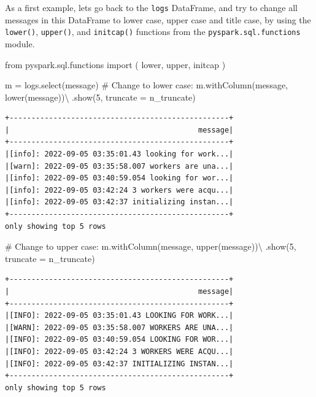 \documentclass[
  11pt,
  letterpaper,
  DIV=11,
  numbers=noendperiod]{scrreprt}
\newenvironment{Shaded}{\begin{snugshade}}{\end{snugshade}}
\newcommand{\CommentTok}[1]{\textcolor[rgb]{0.37,0.37,0.37}{#1}}
\newcommand{\DecValTok}[1]{\textcolor[rgb]{0.68,0.00,0.00}{#1}}
\newcommand{\ImportTok}[1]{\textcolor[rgb]{0.00,0.46,0.62}{#1}}
\newcommand{\NormalTok}[1]{\textcolor[rgb]{0.00,0.23,0.31}{#1}}
\newcommand{\OperatorTok}[1]{\textcolor[rgb]{0.37,0.37,0.37}{#1}}
\newcommand{\StringTok}[1]{\textcolor[rgb]{0.13,0.47,0.30}{#1}}
\begin{document}
As a first example, lets go back to the \texttt{logs} DataFrame, and try
to change all messages in this DataFrame to lower case, upper case and
title case, by using the \texttt{lower()}, \texttt{upper()}, and
\texttt{initcap()} functions from the \texttt{pyspark.sql.functions}
module.

\begin{Shaded}
\begin{Highlighting}[]
\ImportTok{from}\NormalTok{ pyspark.sql.functions }\ImportTok{import}\NormalTok{ (}
\NormalTok{    lower,}
\NormalTok{    upper,}
\NormalTok{    initcap}
\NormalTok{)}

\NormalTok{m }\OperatorTok{=}\NormalTok{ logs.select(}\StringTok{\textquotesingle{}message\textquotesingle{}}\NormalTok{)}
\CommentTok{\# Change to lower case:}
\NormalTok{m.withColumn(}\StringTok{\textquotesingle{}message\textquotesingle{}}\NormalTok{, lower(}\StringTok{\textquotesingle{}message\textquotesingle{}}\NormalTok{))}\OperatorTok{\textbackslash{}}
\NormalTok{    .show(}\DecValTok{5}\NormalTok{, truncate }\OperatorTok{=}\NormalTok{ n\_truncate)}
\end{Highlighting}
\end{Shaded}

\begin{verbatim}
+--------------------------------------------------+
|                                           message|
+--------------------------------------------------+
|[info]: 2022-09-05 03:35:01.43 looking for work...|
|[warn]: 2022-09-05 03:35:58.007 workers are una...|
|[info]: 2022-09-05 03:40:59.054 looking for wor...|
|[info]: 2022-09-05 03:42:24 3 workers were acqu...|
|[info]: 2022-09-05 03:42:37 initializing instan...|
+--------------------------------------------------+
only showing top 5 rows
\end{verbatim}

\begin{Shaded}
\begin{Highlighting}[]
\CommentTok{\# Change to upper case:}
\NormalTok{m.withColumn(}\StringTok{\textquotesingle{}message\textquotesingle{}}\NormalTok{, upper(}\StringTok{\textquotesingle{}message\textquotesingle{}}\NormalTok{))}\OperatorTok{\textbackslash{}}
\NormalTok{    .show(}\DecValTok{5}\NormalTok{, truncate }\OperatorTok{=}\NormalTok{ n\_truncate)}
\end{Highlighting}
\end{Shaded}

\begin{verbatim}
+--------------------------------------------------+
|                                           message|
+--------------------------------------------------+
|[INFO]: 2022-09-05 03:35:01.43 LOOKING FOR WORK...|
|[WARN]: 2022-09-05 03:35:58.007 WORKERS ARE UNA...|
|[INFO]: 2022-09-05 03:40:59.054 LOOKING FOR WOR...|
|[INFO]: 2022-09-05 03:42:24 3 WORKERS WERE ACQU...|
|[INFO]: 2022-09-05 03:42:37 INITIALIZING INSTAN...|
+--------------------------------------------------+
only showing top 5 rows
\end{verbatim}
\end{document}

